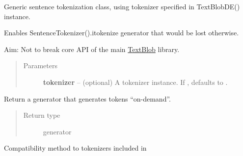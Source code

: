 \documentclass[letterpaper,10pt,english]{sphinxmanual}
\begin{document}
\begin{fulllineitems}
\label{api_reference:textblob_de.tokenizers.SentenceTokenizer}
Generic sentence tokenization class, using tokenizer specified in
TextBlobDE() instance.

Enables SentenceTokenizer().itokenize generator that would be lost otherwise.

Aim: Not to break core API of the main \href{http://textblob.readthedocs.org/}{TextBlob} library.
\begin{quote}\begin{description}
\item[{Parameters}] \leavevmode
\textbf{tokenizer} -- (optional) A tokenizer instance. If , defaults to
{\hyperref[api_reference:textblob_de.tokenizers.NLTKPunktTokenizer]{}}.

\end{description}\end{quote}

\begin{fulllineitems}
\label{api_reference:textblob_de.tokenizers.SentenceTokenizer.itokenize}
Return a generator that generates tokens ``on-demand''.

\begin{quote}\begin{description}
\item[{Return type}] \leavevmode
generator

\end{description}\end{quote}

\end{fulllineitems}


\begin{fulllineitems}
\label{api_reference:textblob_de.tokenizers.SentenceTokenizer.sent_tokenize}
Compatibility method to tokenizers included in 

\end{fulllineitems}


\end{fulllineitems}
\end{document}
